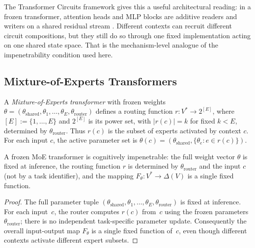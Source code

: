 \documentclass[twoside,11pt]{article}
\begin{document}
The Transformer Circuits framework gives this a useful architectural reading: in a frozen transformer, attention heads and MLP blocks are additive readers and writers on a shared residual stream \citep{elhage_etal_2021_framework}. Different contexts can recruit different circuit compositions, but they still do so through one fixed implementation acting on one shared state space. That is the mechanism-level analogue of the impenetrability condition used here.

\subsection{Mixture-of-Experts Transformers}

\begin{definition}\label{def:moe}
A \emph{Mixture-of-Experts transformer} with frozen weights $\theta = (\theta_{\mathrm{shared}}, \theta_1, \ldots, \theta_E, \theta_{\mathrm{router}})$ defines a routing function $r \colon V^* \to 2^{[E]}$, where $[E] := \{1,\ldots,E\}$ and $2^{[E]}$ is its power set, with $|r(c)| = k$ for fixed $k < E$, determined by $\theta_{\mathrm{router}}$. Thus $r(c)$ is the subset of experts activated by context $c$. For each input $c$, the active parameter set is $\theta(c) = (\theta_{\mathrm{shared}}, \{\theta_e : e \in r(c)\})$.
\end{definition}

\begin{proposition}\label{prop:moe-impen}
A frozen MoE transformer is cognitively impenetrable: the full weight vector $\theta$ is fixed at inference, the routing function $r$ is determined by $\theta_{\mathrm{router}}$ and the input $c$ (not by a task identifier), and the mapping $F_\theta \colon V^* \to \Delta(V)$ is a single fixed function.
\end{proposition}

\begin{proof}
The full parameter tuple $(\theta_{\mathrm{shared}},\theta_1,\ldots,\theta_E,\theta_{\mathrm{router}})$ is fixed at inference. For each input~$c$, the router computes $r(c)$ from~$c$ using the frozen parameters $\theta_{\mathrm{router}}$; there is no independent task-specific parameter update. Consequently the overall input-output map $F_\theta$ is a single fixed function of~$c$, even though different contexts activate different expert subsets.
\end{proof}
\end{document}
